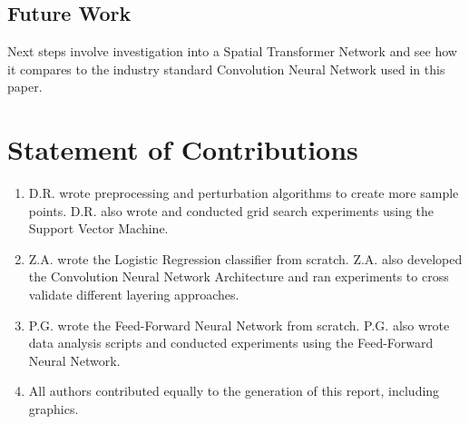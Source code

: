 \documentclass[conference]{IEEEtran}
\begin{document}
\subsection{Future Work}
Next steps involve investigation into a Spatial Transformer Network \cite{STN} and see how it compares to the industry standard Convolution Neural Network used in this paper.


\section{Statement of Contributions}

\begin{enumerate}
\item D.R. wrote preprocessing and perturbation algorithms to create more sample points. D.R. also wrote and conducted grid search experiments using the Support Vector Machine.
\item Z.A. wrote the Logistic Regression classifier from scratch. Z.A. also developed the Convolution Neural Network Architecture and ran experiments to cross validate different layering approaches.
\item P.G. wrote the Feed-Forward Neural Network from scratch. P.G. also wrote data analysis scripts and conducted experiments using the Feed-Forward Neural Network.
\item All authors contributed equally to the generation of this report, including graphics.
\end{enumerate}
\end{document}
